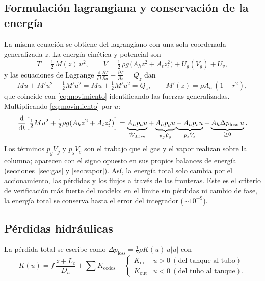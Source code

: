 \documentclass[11pt,a4paper]{article}
\newcommand{\dd}{\mathrm{d}}
\newcommand{\Wdot}{\dot W}
\begin{document}
\subsection{Formulación lagrangiana y conservación de la energía}

La misma ecuación se obtiene del lagrangiano con una sola coordenada generalizada $z$. La energía cinética y potencial son
\begin{equation}
T = \tfrac12\,M(z)\,u^2,\qquad
V = \tfrac12\,\rho g\,\bigl(A_h z^2 + A_t z_t^2\bigr) + U_g(V_g) + U_v ,
\end{equation}
y las ecuaciones de Lagrange $\frac{\dd}{\dd t}\frac{\partial T}{\partial u} - \frac{\partial T}{\partial z} = Q_z$ dan
\begin{equation}
M\dot u + M' u^2 - \tfrac12 M' u^2 = M\dot u + \tfrac12 M' u^2 = Q_z,\qquad M'(z) = \rho A_h\,(1-r^2),
\end{equation}
que coincide con \eqref{eq:movimiento} identificando las fuerzas generalizadas. Multiplicando \eqref{eq:movimiento} por $u$:
\begin{equation}
\frac{\dd}{\dd t}\Bigl[\tfrac12 M u^2 + \tfrac12\rho g(A_h z^2 + A_t z_t^2)\Bigr]
= \underbrace{A_h p_a u}_{\Wdot_{\mathrm{drive}}} + \underbrace{A_h p_g u}_{p_g \dot V_g} \underbrace{-\,A_h p_s u}_{p_s \dot V_s} - \underbrace{A_h \Delta p_{\mathrm{loss}}\,u}_{\ge 0}.
\label{eq:energia_mecanica}
\end{equation}
Los términos $p_g\dot V_g$ y $p_s\dot V_s$ son el trabajo que el gas y el vapor realizan sobre la columna; aparecen con el signo opuesto en sus propios balances de energía (secciones~\ref{sec:gas} y \ref{sec:vapor}). Así, la energía total solo cambia por el accionamiento, las pérdidas y los flujos a través de las fronteras. Este es el criterio de verificación más fuerte del modelo: en el límite sin pérdidas ni cambio de fase, la energía total se conserva hasta el error del integrador ($\sim10^{-9}$).

\subsection{Pérdidas hidráulicas}

La pérdida total se escribe como $\Delta p_{\mathrm{loss}} = \tfrac12\rho K(u)\,u|u|$ con
\begin{equation}
K(u) = f\,\frac{z+L_c}{D_h} + \sum K_{\mathrm{codos}} + \begin{cases} K_{\mathrm{in}} & u>0\ (\text{del tanque al tubo})\\ K_{\mathrm{out}} & u<0\ (\text{del tubo al tanque}).\end{cases}
\end{equation}
\end{document}
